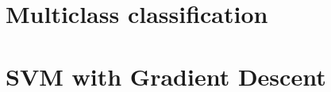 \documentclass{article}
\begin{document}
\subsection{}

\subsection{}

\subsection{}

\subsection{}

\subsection{}


\section{Multiclass classification}

\subsection{}

\subsection{}

\subsection{}

\subsection{}


\section{SVM with Gradient Descent}

\subsection{}

\subsection{}

\subsection{}

\subsection{}
\end{document}
